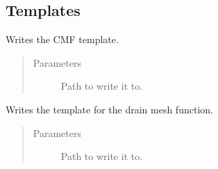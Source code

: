 \documentclass[letterpaper,10pt,english]{sphinxmanual}
\begin{document}
\subsection{Templates}
\label{\detokenize{lib:module-livestock.lib.templates}}\label{\detokenize{lib:templates}}

\begin{fulllineitems}
\label{\detokenize{lib:livestock.lib.templates.cmf_template}}
Writes the CMF template.
\begin{quote}\begin{description}
\item[{Parameters}] \leavevmode
{} \textendash{} Path to write it to.

\end{description}\end{quote}

\end{fulllineitems}


\begin{fulllineitems}
\label{\detokenize{lib:livestock.lib.templates.drain_mesh_template}}
Writes the template for the drain mesh function.
\begin{quote}\begin{description}
\item[{Parameters}] \leavevmode
{} \textendash{} Path to write it to.

\end{description}\end{quote}

\end{fulllineitems}

\end{document}
